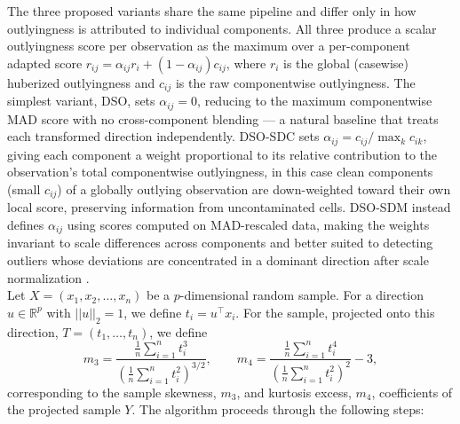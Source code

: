 \documentclass[12pt]{article}
\begin{document}
The three proposed variants share the same pipeline and differ only in how outlyingness is attributed to individual components. All three produce a scalar outlyingness score per observation as the maximum over a per-component adapted score $r_{ij} = \alpha_{ij} r_i + (1-\alpha_{ij}) c_{ij}$, where $r_i$ is the global  (casewise) huberized outlyingness and $c_{ij}$ is the raw componentwise outlyingness. The simplest variant, DSO, sets $\alpha_{ij} = 0$, reducing to the maximum componentwise MAD score with no cross-component blending
— a natural baseline that treats each transformed direction independently. DSO-SDC sets $\alpha_{ij} = c_{ij}/\max_k c_{ik}$, giving each component a weight proportional to its relative contribution to the observation's total componentwise outlyingness, in this case clean components (small $c_{ij}$) of a globally outlying observation are down-weighted toward their own local score, preserving information from uncontaminated cells. DSO-SDM instead defines $\alpha_{ij}$ using scores computed on MAD-rescaled data, making the weights invariant to scale differences across components and better suited to detecting outliers whose deviations are concentrated in a dominant direction after scale normalization \citet{VanAelst2010}. \\

Let $X=(x_1,x_2,\dots,x_n)$ be a $p$-dimensional random sample. For a direction $u \in \mathbb{R}^p$ with $||u||_2= 1$, we define $t_i = u^\top x_i$. For the sample, projected onto this direction, $T = (t_1,\dots , t_n)$, we define
\begin{equation*}
    m_3 = \frac{\displaystyle \frac{1}{n} \sum_{i=1}^n t_i^3}{\displaystyle \left( \frac{1}{n} \sum_{i=1}^n t_i^2 \right)^{3/2}} , \qquad m_4 = \frac{\displaystyle \frac{1}{n} \sum_{i=1}^n t_i^4}{\displaystyle \left( \frac{1}{n} \sum_{i=1}^n t_i^2 \right)^2} - 3 ,
\end{equation*}
corresponding to the sample skewness, $m_3$, and kurtosis excess, $m_4$, coefficients of the projected sample $Y$. The algorithm proceeds through the following steps:
\end{document}
